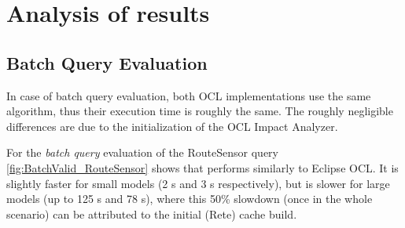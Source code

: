 \section{Analysis of results}


\subsection{Batch Query Evaluation}
In case of batch query evaluation, both OCL implementations use the same
algorithm, thus their execution time is roughly the same. The roughly negligible
differences are due to the initialization of the OCL Impact Analyzer.

For the \emph{batch query} evaluation of the \textsf{RouteSensor} query
\autoref{fig:BatchValid_RouteSensor} shows that \eiq{} performs similarly
to Eclipse OCL. It is slightly faster for small models (2 s and 3 s
respectively), but is slower for large models (up to 125 s and 78 s), where
this 50\% slowdown (once in the whole scenario) can be attributed to the
initial (Rete) cache build.


